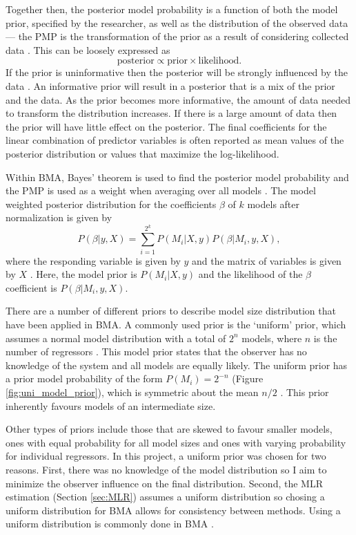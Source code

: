 \documentclass{sfuthesis}
\begin{document}
Together then, the posterior model probability is a function of both the model prior, specified by the researcher, as well as the distribution of the observed data --- the PMP is the transformation of the prior as a result of considering collected data \citep{Wasserman2000}. This can be loosely expressed as
\begin{equation}
\textrm{posterior} \propto \textrm{prior} \times \textrm{likelihood}.
\end{equation}
If the prior is uninformative then the posterior will be strongly influenced by the data \citep{Wasserman2000}. An informative prior will result in a posterior that is a mix of the prior and the data. As the prior becomes more informative, the amount of data needed to transform the distribution increases. If there is a large amount of data then the prior will have little effect on the posterior. The final coefficients for the linear combination of predictor variables is often reported as mean values of the posterior distribution or values that maximize the log-likelihood. 

Within BMA, Bayes' theorem is used to find the posterior model probability and the PMP is used as a weight when averaging over all models \citep{Wasserman2000}. The model weighted posterior distribution for the coefficients $\beta$ of $k$ models after normalization is given by 
\begin{equation}
P(\beta| y,X) = \sum\limits_{i=1}^{2^k} P(M_i | X,y)P(\beta | M_i , y, X),
\end{equation}
where the responding variable is given by $y$ and the matrix of variables is given by $X$ \citep{Raftery1997}. Here, the model prior is $P(M_i | X,y)$ and the likelihood of the $\beta$ coefficient is $P(\beta | M_i , y, X)$.

There are a number of different priors to describe model size distribution that have been applied in BMA. A commonly used prior is the `uniform' prior, which assumes a normal model distribution with a total of $2^n$ models, where $n$ is the number of regressors \citep{Wasserman2000}.  This model prior states that the observer has no knowledge of the system and all models are equally likely. The uniform prior has a prior model probability of the form $P(M_i)=2^{-n}$ (Figure \ref{fig:uni_model_prior}), which is symmetric about the mean $n/2$ \citep{Zeugner2015}. This prior inherently favours models of an intermediate size. 

Other types of priors include those that are skewed to favour smaller models, ones with equal probability for all model sizes and ones with varying probability for individual regressors. In this project, a uniform prior was chosen for two reasons. First, there was no knowledge of the model distribution so I aim to minimize the observer influence on the final distribution. Second, the MLR estimation (Section \ref{sec:MLR}) assumes a uniform distribution so chosing a uniform distribution for BMA allows for consistency between methods. Using a uniform distribution is commonly done in BMA \citep{Wasserman2000}.
\end{document}
